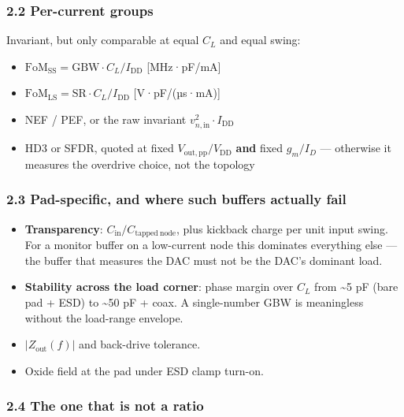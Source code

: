 \documentclass[
  10pt,
  a4paper,
]{article}
\providecommand{\tightlist}{%
  \setlength{\itemsep}{0pt}\setlength{\parskip}{0pt}}
\begin{document}
\hypertarget{per-current-groups}{%
\subsubsection{2.2 Per-current groups}\label{per-current-groups}}

Invariant, but only comparable at equal \(C_L\) and equal swing:

\begin{itemize}
\tightlist
\item
  \(\mathrm{FoM_{SS}} = \mathrm{GBW}\cdot C_L / I_\mathrm{DD}\)
  {[}MHz·pF/mA{]}
\item
  \(\mathrm{FoM_{LS}} = \mathrm{SR}\cdot C_L / I_\mathrm{DD}\)
  {[}V·pF/(µs·mA){]}
\item
  NEF / PEF, or the raw invariant
  \(v_{n,\mathrm{in}}^2 \cdot I_\mathrm{DD}\)
\item
  HD3 or SFDR, quoted at fixed \(V_\mathrm{out,pp}/V_\mathrm{DD}\)
  \textbf{and} fixed \(g_m/I_D\) --- otherwise it measures the overdrive
  choice, not the topology
\end{itemize}

\hypertarget{pad-specific-and-where-such-buffers-actually-fail}{%
\subsubsection{2.3 Pad-specific, and where such buffers actually
fail}\label{pad-specific-and-where-such-buffers-actually-fail}}

\begin{itemize}
\tightlist
\item
  \textbf{Transparency}: \(C_\mathrm{in}/C_\mathrm{tapped\ node}\), plus
  kickback charge per unit input swing. For a monitor buffer on a
  low-current node this dominates everything else --- the buffer that
  measures the DAC must not be the DAC's dominant load.
\item
  \textbf{Stability across the load corner}: phase margin over \(C_L\)
  from \textasciitilde5 pF (bare pad + ESD) to \textasciitilde50 pF +
  coax. A single-number GBW is meaningless without the load-range
  envelope.
\item
  \(|Z_\mathrm{out}(f)|\) and back-drive tolerance.
\item
  Oxide field at the pad under ESD clamp turn-on.
\end{itemize}

\hypertarget{the-one-that-is-not-a-ratio}{%
\subsubsection{2.4 The one that is not a
ratio}\label{the-one-that-is-not-a-ratio}}
\end{document}
